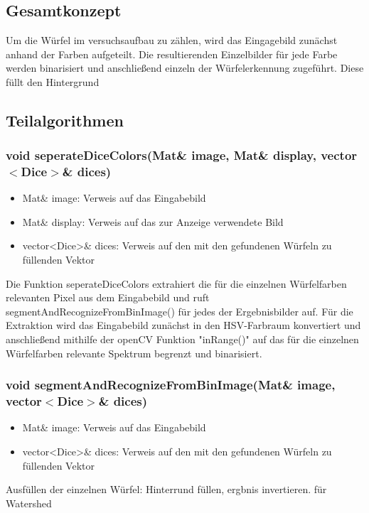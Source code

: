 \documentclass{../Vorlage/sebDenCls}
\begin{document}

\section{}
\subsection{Gesamtkonzept}
Um die Würfel im versuchsaufbau zu zählen, wird das Eingagebild zunächst anhand der Farben aufgeteilt. Die resultierenden Einzelbilder für jede Farbe werden binarisiert und anschließend einzeln der Würfelerkennung zugeführt. Diese füllt den Hintergrund 


\subsection{Teilalgorithmen}
\subsubsection{void seperateDiceColors(Mat\& image, Mat\& display, vector $<$Dice$>$\& dices)}
\begin{itemize}
	\item Mat\& image: Verweis auf das Eingabebild
	\item Mat\& display: Verweis auf das zur Anzeige verwendete Bild 
	\item vector<Dice>\& dices: Verweis auf den mit den gefundenen Würfeln zu füllenden Vektor
\end{itemize}
Die Funktion seperateDiceColors extrahiert die für die einzelnen Würfelfarben relevanten Pixel aus dem Eingabebild und ruft segmentAndRecognizeFromBinImage() für jedes der Ergebnisbilder auf.
Für die Extraktion wird das Eingabebild zunächst in den HSV-Farbraum konvertiert und anschließend mithilfe der openCV Funktion "inRange()" auf das für die einzelnen Würfelfarben relevante Spektrum begrenzt und binarisiert. 

\subsubsection{void segmentAndRecognizeFromBinImage(Mat\& image, vector$<$Dice$>$\& dices)}
\begin{itemize}
	\item Mat\& image: Verweis auf das Eingabebild
	\item vector<Dice>\& dices: Verweis auf den mit den gefundenen Würfeln zu füllenden Vektor
\end{itemize}
Ausfüllen der einzelnen Würfel: Hinterrund füllen, ergbnis invertieren. für Watershed
\end{document}
